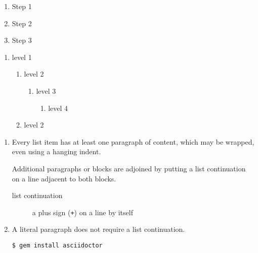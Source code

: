 \begin{enumerate}

\item{Step 1}

\item{Step 2}

\item{Step 3}

\end{enumerate}


\begin{enumerate}

\item{level 1}

\begin{enumerate}

\item{level 2}

\begin{enumerate}

\item{level 3}

\begin{enumerate}

\item{level 4}

\end{enumerate}

\end{enumerate}

\item{level 2}

\end{enumerate}

\end{enumerate}


\begin{enumerate}

\item{Every list item has at least one paragraph of content,
which may be wrapped, even using a hanging indent.}

Additional paragraphs or blocks are adjoined by putting
a list continuation on a line adjacent to both blocks.


\begin{description}

\item[list continuation]a plus sign ({\tt +}) on a line by itself

\end{description}

\item{A literal paragraph does not require a list continuation.}

\begin{verbatim}
$ gem install asciidoctor
\end{verbatim}
\end{enumerate}


